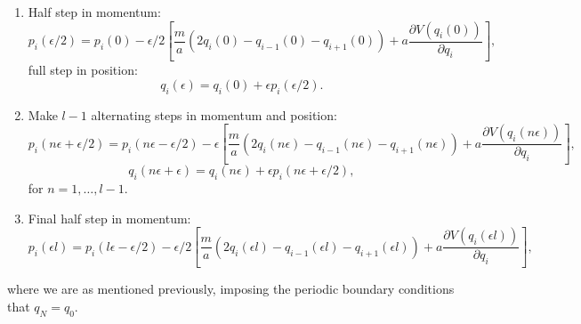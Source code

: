 \documentclass[12pt]{article}
\begin{document}
            \begin{enumerate}
                \item Half step in momentum:
                \begin{equation}
                    \label{eq:MomentumInitialHalfStepQuadraticQHO}
                    p_i\left(\epsilon/2\right) = p_i\left(0\right) - \epsilon/2\left[\frac{m}{a}\left(2q_i\left(0\right)-q_{i-1}\left(0\right)-q_{i+1}\left(0\right)\right)+a\frac{\partial V\left(q_i\left(0\right)\right)}{\partial q_i}\right],
                \end{equation}
                full step in position:
                \begin{equation}
                    \label{eq:PositionInitialStepQuadraticQHO}
                    q_i\left(\epsilon\right) = q_i\left(0\right) + \epsilon p_i\left(\epsilon/2\right).
                \end{equation}
                \item Make $l-1$ alternating steps in momentum and position:
                \begin{equation}
                    \label{eq:MomentumFullStepQuadraticQHO}
                    p_i\left(n\epsilon+\epsilon/2\right) = p_i\left(n\epsilon-\epsilon/2\right) - \epsilon\left[\frac{m}{a}\left(2q_i\left(n\epsilon\right)-q_{i-1}\left(n\epsilon\right)-q_{i+1}\left(n\epsilon\right)\right)+a\frac{\partial V\left(q_i\left(n\epsilon\right)\right)}{\partial q_i}\right],
                \end{equation}
                \begin{equation}
                    \label{eq:PositionFullStepQuadraticQHO}
                    q_i\left(n\epsilon+\epsilon\right) = q_i\left(n\epsilon\right) + \epsilon p_i\left(n\epsilon+\epsilon/2\right),
                \end{equation}
                for $n = 1, \dots , l-1$.
                \item Final half step in momentum:
                \begin{equation}
                    \label{eq:MomnetumQuadraticKinetic}
                    p_i\left(\epsilon l\right) = p_i\left(l\epsilon-\epsilon/2\right) - \epsilon/2\left[\frac{m}{a}\left(2q_i\left(\epsilon l\right)-q_{i-1}\left(\epsilon l\right)-q_{i+1}\left(\epsilon l\right)\right)+a\frac{\partial V\left(q_i\left(\epsilon l\right)\right)}{\partial q_i}\right],
                \end{equation}
            \end{enumerate}
            where we are as mentioned previously, imposing the periodic boundary conditions that $q_N=q_0$.
\end{document}
